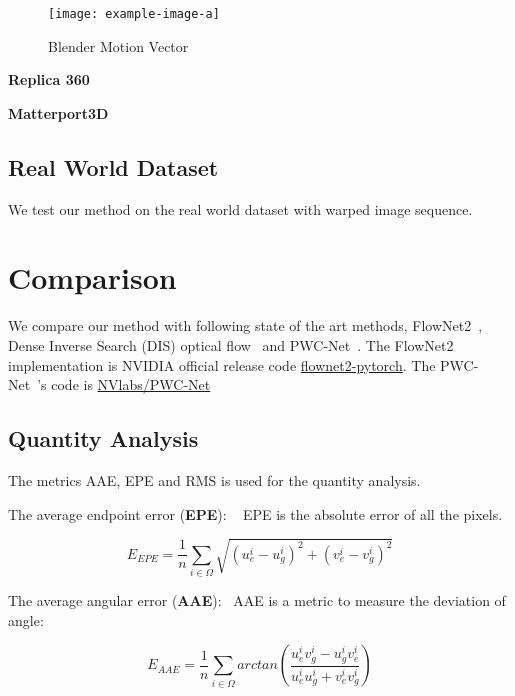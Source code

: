 \begin{figure}[hbt!]
	\centering
	\texttt{[image: example-image-a]}
	\caption{Blender Motion Vector}
	\label{fig:exp:blendermv}
\end{figure}

\textbf{Replica 360} ~\cite{replica19arxiv}



\textbf{Matterport3D} ~\cite{Matterport3D}


\subsection{Real World Dataset}

We test our method on the real world dataset with warped image sequence.

\section{Comparison}

We compare our method with following state of the art methods, FlowNet2~\cite{ilg2017flownet}, Dense Inverse Search (DIS) optical flow~\cite{kroeger2016fast} and PWC-Net~\cite{sun2018pwc}. 
The FlowNet2~\cite{ilg2017flownet} implementation is NVIDIA official release code \href{https://github.com/NVIDIA/flownet2-pytorch}{flownet2-pytorch}.
The PWC-Net~\cite{sun2018pwc}'s code is \href{https://github.com/NVlabs/PWC-Net}{NVlabs/PWC-Net}

\subsection{Quantity Analysis}

The metrics AAE, EPE and RMS is used for the quantity analysis.

The average endpoint error (\textbf{EPE}):  ~\cite{??}
EPE is the absolute error of all the pixels. 

\begin{equation}\label{equ_exp_epe}
E_{EPE} = \frac{1}{n} \sum_{i \in \Omega}\sqrt{(u_e^i - u_g^i)^2 + (v_e^i - v_g^i)^2}
\end{equation}

The average angular error (\textbf{AAE}):~\cite{??}
AAE is a metric to measure the deviation of angle:

\begin{equation}\label{equ_exp_aae}
	E_{AAE} = \frac{1}{n} \sum_{i \in \Omega}arctan(\frac{u^i_e v^i_g - u^i_g v^i_e}{u^i_e u^i_g + v^i_e v^i_g})
\end{equation}

